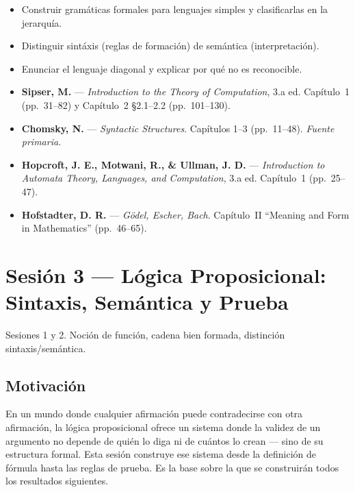 \documentclass[11pt, letterpaper]{article}
\begin{document}
\begin{objetivos}
\begin{itemize}
  \item Construir gram\'aticas formales para lenguajes simples y clasificarlas en la jerarqu\'ia.
  \item Distinguir sint\'axis (reglas de formaci\'on) de sem\'antica (interpretaci\'on).
  \item Enunciar el lenguaje diagonal y explicar por qu\'e no es reconocible.
\end{itemize}
\end{objetivos}

\begin{lecturas}
\begin{itemize}
  \item[$(\star)$] \textbf{Sipser, M.} --- \emph{Introduction to the Theory of Computation}, 3.a ed. Cap\'itulo~1 (pp.\ 31--82) y Cap\'itulo~2 \S2.1--2.2 (pp.\ 101--130).
  \item[$(\star)$] \textbf{Chomsky, N.} --- \emph{Syntactic Structures}. Cap\'itulos 1--3 (pp.\ 11--48). \textit{Fuente primaria.}
  \item \textbf{Hopcroft, J. E., Motwani, R., \& Ullman, J. D.} --- \emph{Introduction to Automata Theory, Languages, and Computation}, 3.a ed. Cap\'itulo~1 (pp.\ 25--47).
  \item \textbf{Hofstadter, D. R.} --- \emph{G\"odel, Escher, Bach}. Cap\'itulo~II ``Meaning and Form in Mathematics'' (pp.\ 46--65).
\end{itemize}
\end{lecturas}

\newpage

\section{Sesi\'on 3 --- L\'ogica Proposicional: Sintaxis, Sem\'antica y Prueba}

\begin{prereqs}
Sesiones 1 y 2. Noci\'on de funci\'on, cadena bien formada, distinci\'on sintaxis/sem\'antica.
\end{prereqs}

\subsection*{Motivaci\'on}
En un mundo donde cualquier afirmaci\'on puede contradecirse con otra afirmaci\'on, la l\'ogica proposicional ofrece un sistema donde la validez de un argumento no depende de qui\'en lo diga ni de cu\'antos lo crean --- sino de su estructura formal. Esta sesi\'on construye ese sistema desde la definici\'on de f\'ormula hasta las reglas de prueba. Es la base sobre la que se construir\'an todos los resultados siguientes.
\end{document}
